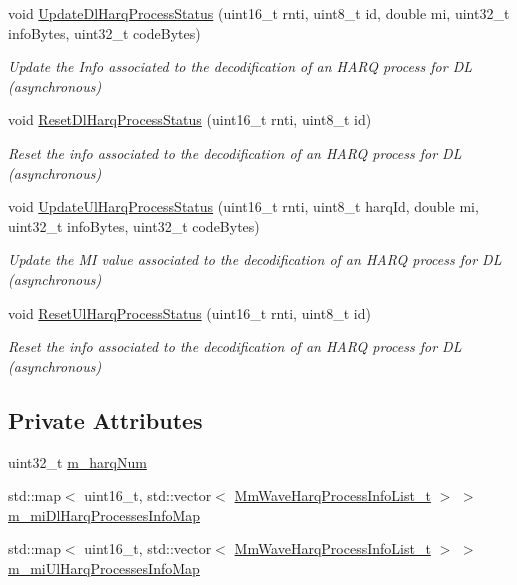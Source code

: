 \begin{DoxyCompactItemize}
void \hyperlink{classns3_1_1MmWaveHarqPhy_a896f624781fee330395ecfc3af948a1c}{Update\+Dl\+Harq\+Process\+Status} (uint16\+\_\+t rnti, uint8\+\_\+t id, double mi, uint32\+\_\+t info\+Bytes, uint32\+\_\+t code\+Bytes)
\begin{DoxyCompactList}\small\item\em Update the Info associated to the decodification of an H\+A\+RQ process for DL (asynchronous) \end{DoxyCompactList}\item 
void \hyperlink{classns3_1_1MmWaveHarqPhy_aa9211fae5bdc31201e371db523e47ac5}{Reset\+Dl\+Harq\+Process\+Status} (uint16\+\_\+t rnti, uint8\+\_\+t id)
\begin{DoxyCompactList}\small\item\em Reset the info associated to the decodification of an H\+A\+RQ process for DL (asynchronous) \end{DoxyCompactList}\item 
void \hyperlink{classns3_1_1MmWaveHarqPhy_aa8271a9d22c75c84caf42a8d955808da}{Update\+Ul\+Harq\+Process\+Status} (uint16\+\_\+t rnti, uint8\+\_\+t harq\+Id, double mi, uint32\+\_\+t info\+Bytes, uint32\+\_\+t code\+Bytes)
\begin{DoxyCompactList}\small\item\em Update the MI value associated to the decodification of an H\+A\+RQ process for DL (asynchronous) \end{DoxyCompactList}\item 
void \hyperlink{classns3_1_1MmWaveHarqPhy_aa5bf2f510f7bf1876464ab855ef8ca76}{Reset\+Ul\+Harq\+Process\+Status} (uint16\+\_\+t rnti, uint8\+\_\+t id)
\begin{DoxyCompactList}\small\item\em Reset the info associated to the decodification of an H\+A\+RQ process for DL (asynchronous) \end{DoxyCompactList}\end{DoxyCompactItemize}
\subsection*{Private Attributes}
\begin{DoxyCompactItemize}
\item 
uint32\+\_\+t \hyperlink{classns3_1_1MmWaveHarqPhy_a3f052a77084afbac3ae04ca1de543a71}{m\+\_\+harq\+Num}
\item 
std\+::map$<$ uint16\+\_\+t, std\+::vector$<$ \hyperlink{namespacens3_aca7c6bab455c2515f3e437749b5e904d}{Mm\+Wave\+Harq\+Process\+Info\+List\+\_\+t} $>$ $>$ \hyperlink{classns3_1_1MmWaveHarqPhy_aed3643640d3493d9afd67293bb33a2d2}{m\+\_\+mi\+Dl\+Harq\+Processes\+Info\+Map}
\item 
std\+::map$<$ uint16\+\_\+t, std\+::vector$<$ \hyperlink{namespacens3_aca7c6bab455c2515f3e437749b5e904d}{Mm\+Wave\+Harq\+Process\+Info\+List\+\_\+t} $>$ $>$ \hyperlink{classns3_1_1MmWaveHarqPhy_ab8f5ff765751b8ba84f4d0f4f7c1edc7}{m\+\_\+mi\+Ul\+Harq\+Processes\+Info\+Map}
\end{DoxyCompactItemize}
